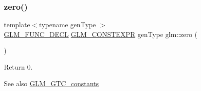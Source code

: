 \subsubsection{\texorpdfstring{zero()}{zero()}}
{\footnotesize\ttfamily template$<$typename gen\+Type $>$ \\
\hyperlink{setup_8hpp_ab2d052de21a70539923e9bcbf6e83a51}{G\+L\+M\+\_\+\+F\+U\+N\+C\+\_\+\+D\+E\+CL} \hyperlink{setup_8hpp_a08b807947b47031d3a511f03f89645ad}{G\+L\+M\+\_\+\+C\+O\+N\+S\+T\+E\+X\+PR} gen\+Type glm\+::zero (\begin{DoxyParamCaption}{ }\end{DoxyParamCaption})}

Return 0. \begin{DoxySeeAlso}{See also}
\hyperlink{group__gtc__constants}{G\+L\+M\+\_\+\+G\+T\+C\+\_\+constants} 
\end{DoxySeeAlso}
